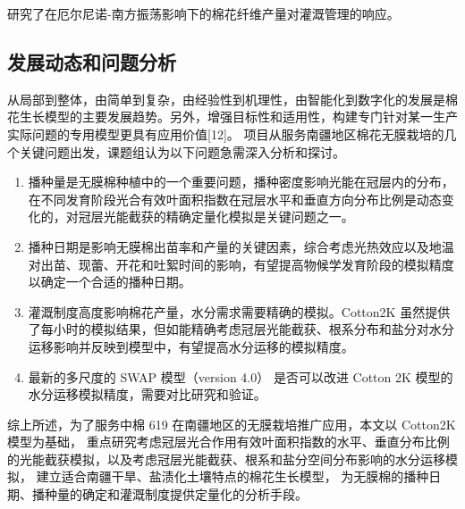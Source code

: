  研究了在厄尔尼诺-南方振荡影响下的棉花纤维产量对灌溉管理的响应。


\subsection{发展动态和问题分析}
从局部到整体，由简单到复杂，由经验性到机理性，由智能化到数字化的发展是棉花生长模型的主要发展趋势。另外，增强目标性和适用性，构建专门针对某一生产实际问题的专用模型更具有应用价值[12]。
项目从服务南疆地区棉花无膜栽培的几个关键问题出发，课题组认为以下问题急需深入分析和探讨。

\begin{enumerate}
    \item 播种量是无膜棉种植中的一个重要问题，播种密度影响光能在冠层内的分布，在不同发育阶段光合有效叶面积指数在冠层水平和垂直方向分布比例是动态变化的，对冠层光能截获的精确定量化模拟是关键问题之一。
    \item 播种日期是影响无膜棉出苗率和产量的关键因素，综合考虑光热效应以及地温对出苗、现蕾、开花和吐絮时间的影响，有望提高物候学发育阶段的模拟精度以确定一个合适的播种日期。
    \item 灌溉制度高度影响棉花产量，水分需求需要精确的模拟。Cotton2K 虽然提供了每小时的模拟结果，但如能精确考虑冠层光能截获、根系分布和盐分对水分运移影响并反映到模型中，有望提高水分运移的模拟精度。
    \item 最新的多尺度的 SWAP 模型（version 4.0）\cite{swap2021} 是否可以改进 Cotton 2K 模型的水分运移模拟精度，需要对比研究和验证。
\end{enumerate}

综上所述，为了服务中棉 619 在南疆地区的无膜栽培推广应用，本文以 Cotton2K 模型为基础，
重点研究考虑冠层光合作用有效叶面积指数的水平、垂直分布比例的光能截获模拟，以及考虑冠层光能截获、根系和盐分空间分布影响的水分运移模拟，
建立适合南疆干旱、盐渍化土壤特点的棉花生长模型，
为无膜棉的播种日期、播种量的确定和灌溉制度提供定量化的分析手段。
